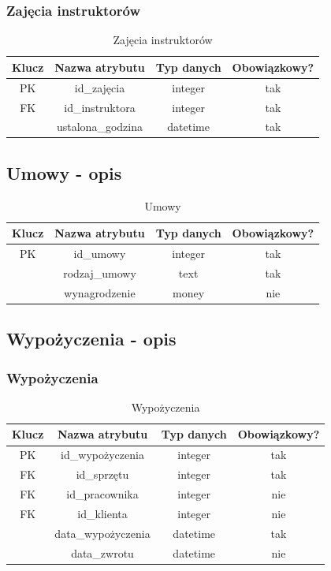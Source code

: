 \documentclass{sprawozdanie-agh}
\begin{document}
\subsubsection{Zajęcia instruktorów}
\begin{table}[H]
	\centering
	\begin{tabular}{|c|c|c|c|}
		\hline
		Klucz & Nazwa atrybutu    & Typ danych & Obowiązkowy? \\ \hline
		PK    & id\_zajęcia      & integer    & tak           \\ \hline
		FK    & id\_instruktora   & integer    & tak           \\ \hline
		      & ustalona\_godzina & datetime   & tak           \\ \hline
	\end{tabular}
	\caption{Zajęcia instruktorów}
\end{table}

\subsection{Umowy - opis}
\begin{table}[H]
	\centering
	\begin{tabular}{|c|c|c|c|}
		\hline
		Klucz & Nazwa atrybutu & Typ danych & Obowiązkowy? \\ \hline
		PK    & id\_umowy      & integer    & tak           \\ \hline
		      & rodzaj\_umowy  & text       & tak           \\ \hline
		      & wynagrodzenie  & money      & nie           \\ \hline
	\end{tabular}
	\caption{Umowy}
\end{table}

\subsection{Wypożyczenia - opis}
\subsubsection{Wypożyczenia}
\begin{table}[H]
	\centering
	\begin{tabular}{|c|c|c|c|}
		\hline
		Klucz & Nazwa atrybutu      & Typ danych & Obowiązkowy? \\ \hline
		PK    & id\_wypożyczenia   & integer    & tak           \\ \hline
		FK    & id\_sprzętu        & integer    & tak           \\ \hline
		FK    & id\_pracownika      & integer    & nie           \\ \hline
		FK    & id\_klienta         & integer    & nie           \\ \hline
		      & data\_wypożyczenia & datetime   & tak           \\ \hline
		      & data\_zwrotu        & datetime   & nie           \\ \hline
	\end{tabular}
	\caption{Wypożyczenia}
\end{table}
\end{document}
